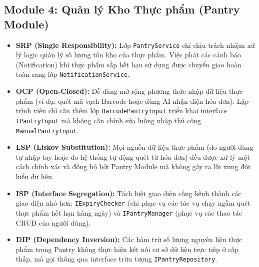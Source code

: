 \documentclass[12pt,a4paper]{article}
\begin{document}
\subsection{Module 4: Quản lý Kho Thực phẩm (Pantry Module)}
\begin{itemize}
    \item \textbf{SRP (Single Responsibility):} Lớp \texttt{PantryService} chỉ chịu trách nhiệm xử lý logic quản lý số lượng tồn kho của thực phẩm. Việc phát các cảnh báo (Notification) khi thực phẩm sắp hết hạn sử dụng được chuyển giao hoàn toàn sang lớp \texttt{NotificationService}.
    \item \textbf{OCP (Open-Closed):} Dễ dàng mở rộng phương thức nhập dữ liệu thực phẩm (ví dụ: quét mã vạch Barcode hoặc dùng AI nhận diện hóa đơn). Lập trình viên chỉ cần thêm lớp \texttt{BarcodePantryInput} triển khai interface \texttt{IPantryInput} mà không cần chỉnh sửa luồng nhập thủ công \texttt{ManualPantryInput}.
    \item \textbf{LSP (Liskov Substitution):} Mọi nguồn dữ liệu thực phẩm (do người dùng tự nhập tay hoặc do hệ thống tự động quét từ hóa đơn) đều được xử lý một cách chính xác và đồng bộ bởi Pantry Module mà không gây ra lỗi xung đột kiểu dữ liệu.
    \item \textbf{ISP (Interface Segregation):} Tách biệt giao diện cồng kềnh thành các giao diện nhỏ hơn: \texttt{IExpiryChecker} (chỉ phục vụ các tác vụ chạy ngầm quét thực phẩm hết hạn hàng ngày) và \texttt{IPantryManager} (phục vụ các thao tác CRUD của người dùng).
    \item \textbf{DIP (Dependency Inversion):} Các hàm trừ số lượng nguyên liệu thực phẩm trong Pantry không thực hiện kết nối cơ sở dữ liệu trực tiếp ở cấp thấp, mà gọi thông qua interface trừu tượng \texttt{IPantryRepository}.
\end{itemize}
\end{document}
